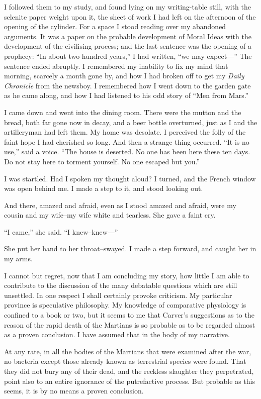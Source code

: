 I followed them to my study, and found lying on my writing-table
still, with the selenite paper weight upon it, the sheet of work I
had left on the afternoon of the opening of the cylinder. For a
space I stood reading over my abandoned arguments. It was a paper
on the probable development of Moral Ideas with the development of
the civilising process; and the last sentence was the opening of a
prophecy: ``In about two hundred years,'' I had written, ``we may
expect---'' The sentence ended abruptly. I remembered my inability
to fix my mind that morning, scarcely a month gone by, and how I
had broken off to get my \emph{Daily Chronicle} from the newsboy. I
remembered how I went down to the garden gate as he came along, and
how I had listened to his odd story of ``Men from Mars.''

I came down and went into the dining room. There were the mutton
and the bread, both far gone now in decay, and a beer bottle
overturned, just as I and the artilleryman had left them. My home
was desolate. I perceived the folly of the faint hope I had
cherished so long. And then a strange thing occurred. ``It is no
use,'' said a voice. ``The house is deserted. No one has been here
these ten days. Do not stay here to torment yourself. No one
escaped but you.''

I was startled. Had I spoken my thought aloud? I turned, and the
French window was open behind me. I made a step to it, and stood
looking out.

And there, amazed and afraid, even as I stood amazed and afraid,
were my cousin and my wife--my wife white and tearless. She gave a
faint cry.

``I came,'' she said. ``I knew--knew---''

She put her hand to her throat--swayed. I made a step forward, and
caught her in my arms.

I cannot but regret, now that I am concluding my story, how little
I am able to contribute to the discussion of the many debatable
questions which are still unsettled. In one respect I shall
certainly provoke criticism. My particular province is speculative
philosophy. My knowledge of comparative physiology is confined to a
book or two, but it seems to me that Carver's suggestions as to the
reason of the rapid death of the Martians is so probable as to be
regarded almost as a proven conclusion. I have assumed that in the
body of my narrative.

At any rate, in all the bodies of the Martians that were examined
after the war, no bacteria except those already known as
terrestrial species were found. That they did not bury any of their
dead, and the reckless slaughter they perpetrated, point also to an
entire ignorance of the putrefactive process. But probable as this
seems, it is by no means a proven conclusion.

